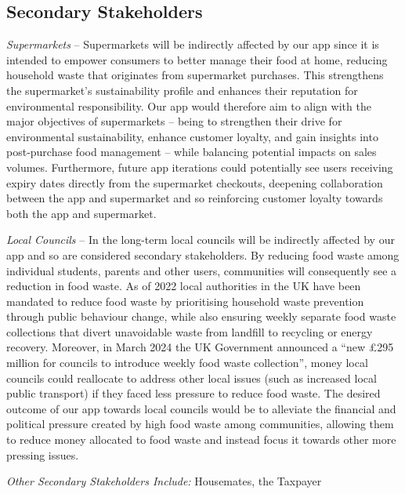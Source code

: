 \subsection{Secondary Stakeholders}
    \indent\indent \textit{Supermarkets} – Supermarkets will be indirectly affected by our app since it is intended to empower consumers to better manage their food at home, reducing household waste that originates from supermarket purchases. This strengthens the supermarket’s sustainability profile and enhances their reputation for environmental responsibility. Our app would therefore aim to align with the major objectives of supermarkets\cite{WRAPSRETAILSURVEY} – being to strengthen their drive for environmental sustainability, enhance customer loyalty, and gain insights into post-purchase food management – while balancing potential impacts on sales volumes. Furthermore, future app iterations could potentially see users receiving expiry dates directly from the supermarket checkouts, deepening collaboration between the app and supermarket and so reinforcing customer loyalty towards both the app and supermarket.\\
    \par
    \textit{Local Councils} – In the long-term local councils will be indirectly affected by our app and so are considered secondary stakeholders. By reducing food waste among individual students, parents and other users, communities will consequently see a reduction in food waste. As of 2022 local authorities in the UK have been mandated to reduce food waste by prioritising household waste prevention through public behaviour change\cite{peacockLocalAuthorityCollected}, while also ensuring weekly separate food waste collections that divert unavoidable waste from landfill to recycling or energy recovery. Moreover, in March 2024 the UK Government announced a “new £295 million for councils to introduce weekly food waste collection”\cite{NewPS295mCouncils}, money local councils could reallocate to address other local issues (such as increased local public transport\cite{HowLocalTransport2024}) if they faced less pressure to reduce food waste. The desired outcome of our app towards local councils would be to alleviate the financial and political pressure created by high food waste among communities, allowing them to reduce money allocated to food waste and instead focus it towards other more pressing issues.\\
    \par
    \textit{Other Secondary Stakeholders Include:} Housemates, the Taxpayer
